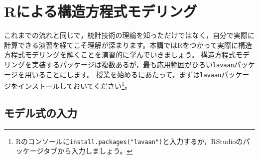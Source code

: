 \documentclass{ltjsbook}
\begin{document}
\VerbatimFootnotes
\chapter{Rによる構造方程式モデリング}
\label{x13_SEMonR}

これまでの流れと同じで，統計技術の理論を知っただけではなく，自分で実際に計算できる演習を経てこそ理解が深まります。本講ではRをつかって実際に構造方程式モデリングを解くことを演習的に学んでいきましょう。
構造方程式モデリングを実装するパッケージは複数あるが，最も応用範囲がひろい\texttt{lavaan}パッケージを用いることにします。
授業を始めるにあたって，まずは\texttt{lavaan}パッケージをインストールしておいてください\footnote{Rのコンソールに\verb|install.packages("lavaan")|と入力するか，RStudioのパッケージタブから入力しましょう。}。

\section{モデル式の入力}
\end{document}
